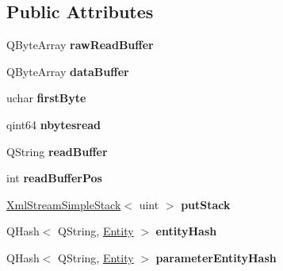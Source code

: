 \subsection*{Public Attributes}
\begin{DoxyCompactItemize}
\item 
\mbox{\label{class_xml_stream_reader_private_a2021bbe1e5fe8c27847b9c19872f4207}} 
Q\+Byte\+Array {\bfseries raw\+Read\+Buffer}
\item 
\mbox{\label{class_xml_stream_reader_private_af8e76c00604642fe3a3f541b488e1424}} 
Q\+Byte\+Array {\bfseries data\+Buffer}
\item 
\mbox{\label{class_xml_stream_reader_private_a422c9c7a3dff96a5e11e20d575de83e7}} 
uchar {\bfseries first\+Byte}
\item 
\mbox{\label{class_xml_stream_reader_private_a165685380bcd08cd53b7df142dc6e20d}} 
qint64 {\bfseries nbytesread}
\item 
\mbox{\label{class_xml_stream_reader_private_acb9d60cee73e0d1d63de13dcc806623b}} 
Q\+String {\bfseries read\+Buffer}
\item 
\mbox{\label{class_xml_stream_reader_private_af9327e005b9d86892a13c464d2e54b2e}} 
int {\bfseries read\+Buffer\+Pos}
\item 
\mbox{\label{class_xml_stream_reader_private_a8e2b2d8597a2f806e784b3401e284173}} 
\hyperlink{class_xml_stream_simple_stack}{Xml\+Stream\+Simple\+Stack}$<$ uint $>$ {\bfseries put\+Stack}
\item 
\mbox{\label{class_xml_stream_reader_private_a94131e0f777eee05da02a918b3aa1516}} 
Q\+Hash$<$ Q\+String, \hyperlink{struct_xml_stream_reader_private_1_1_entity}{Entity} $>$ {\bfseries entity\+Hash}
\item 
\mbox{\label{class_xml_stream_reader_private_ac15bb05b6d9a74696bb5583f4923a68d}} 
Q\+Hash$<$ Q\+String, \hyperlink{struct_xml_stream_reader_private_1_1_entity}{Entity} $>$ {\bfseries parameter\+Entity\+Hash}

\end{DoxyCompactItemize}
